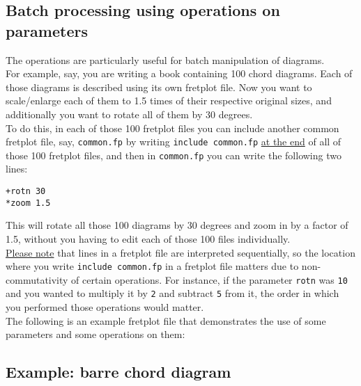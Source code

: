 \documentclass[12pt,letterpaper]{article}
\begin{document}
\subsection{Batch processing using operations on parameters}

The operations are particularly useful for batch manipulation of diagrams.\\

For example, say, you are writing a book containing 100 chord diagrams. Each of those diagrams is described using its own fretplot file. Now you want to scale/enlarge each of them to 1.5 times of their respective original sizes, and additionally you want to rotate all of them by 30 degrees.\\

To do this, in each of those 100 fretplot files you can include another common fretplot file, say, \texttt{common.fp} by writing \texttt{include common.fp} \uline{at the end} of all of those 100 fretplot files, and then in \texttt{common.fp} you can write the following two lines:\\

\begin{lstlisting}[language=fretplot]
+rotn 30
*zoom 1.5
\end{lstlisting}

This will rotate all those 100 diagrams by 30 degrees and zoom in by a factor of 1.5, without you having to edit each of those 100 files individually.\\

\uline{Please note} that lines in a fretplot file are interpreted sequentially, so the location where you write \texttt{include common.fp} in a fretplot file matters due to non-commutativity of certain operations. For instance, if the parameter \texttt{rotn} was \texttt{10} and you wanted to multiply it by \texttt{2} and subtract \texttt{5} from it, the order in which you performed those operations would matter.\\

The following is an example fretplot file that demonstrates the use of some parameters and some operations on them:\\



\subsection{Example: barre chord diagram}
\end{document}
